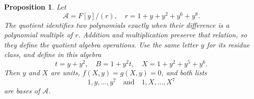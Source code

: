 \documentclass{article}
\newtheorem{proposition}{Proposition}
\begin{document}
\begin{proposition}\label{prop:algebra}
  Let
  \begin{equation}
    \mathcal{A} = F[y]/(r), \quad r = 1 + y + y^2 + y^6 + y^8.
  \end{equation}
  The quotient identifies two polynomials exactly when their difference is a polynomial multiple
  of \(r\). Addition and multiplication preserve that relation, so they define the quotient
  algebra operations. Use the same letter \(y\) for its residue class, and define in this algebra
  \begin{equation}
    t = y + y^2, \quad B = 1 + y^2 t, \quad X = 1 + y^2 + y^5 + y^6.
  \end{equation}
  Then \(y\) and \(X\) are units, \(f(X,y) = g(X,y) = 0\), and both lists
  \begin{equation}
    1, y, \dots, y^7 \quad \text{and} \quad 1, X, \dots, X^7
  \end{equation}
  are bases of \(\mathcal{A}\).
\end{proposition}
\end{document}
